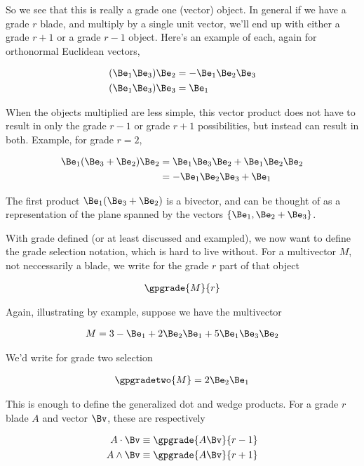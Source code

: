 So we see that this is really a grade one (vector) object.  In general if we have a grade $r$ blade, and multiply by a single unit vector, we'll end up with either a grade $r+1$ or a grade $r-1$ object.  Here's an example of each, again for orthonormal Euclidean vectors,

\begin{align*}
(\Be_1 \Be_3) \Be_2 &= -\Be_1 \Be_2 \Be_3 \\
(\Be_1 \Be_3) \Be_3 &= \Be_1
\end{align*}

When the objects multiplied are less simple, this vector product does not have to result in only the grade $r-1$ or grade $r+1$ possibilities, but instead can result in both.  Example, for grade $r=2$,

\begin{align*}
\Be_1 (\Be_3 + \Be_2) \Be_2 
&= \Be_1 \Be_3 \Be_2 + \Be_1 \Be_2 \Be_2 \\
&= -\Be_1 \Be_2 \Be_3 + \Be_1 \\
\end{align*}

The first product $\Be_1 (\Be_3 + \Be_2)$ is a bivector, and can be thought of as a representation of the plane spanned by the vectors $\{\Be_1, \Be_2 + \Be_3\}$.

With grade defined (or at least discussed and exampled), we now want to define the grade selection notation, which is hard to live without.  For a multivector $M$, not neccessarily a blade, we write for the grade $r$ part of that object

\begin{align}\label{eqn:foo3}
\gpgrade{M}{r}
\end{align}

Again, illustrating by example, suppose we have the multivector

\begin{align*}
M = 3 -\Be_1 + 2 \Be_2 \Be_1 + 5 \Be_1 \Be_3 \Be_2 
\end{align*}

We'd write for grade two selection

\begin{align*}
\gpgradetwo{M} = 2 \Be_2 \Be_1
\end{align*}

This is enough to define the generalized dot and wedge products.  For a grade $r$ blade $A$ and vector $\Bv$, these are respectively

\begin{align}\label{eqn:foo4}
A \cdot \Bv &\equiv \gpgrade{A \Bv}{r-1} \\
A \wedge \Bv &\equiv \gpgrade{A \Bv}{r+1} 
\end{align}

